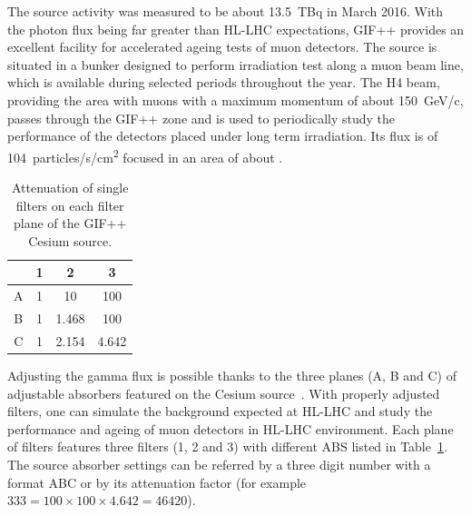 	The source activity was measured to be about \SI{13.5}{TBq} in March 2016. With the photon flux being far greater than HL-LHC expectations, GIF++ provides an excellent facility for accelerated ageing tests of muon detectors. The source is situated in a bunker designed to perform irradiation test along a muon beam line, which is available during selected periods throughout the year. The H4 beam, providing the area with muons with a maximum momentum of about \SI{150}{GeV/c}, passes through the GIF++ zone and is used to periodically study the performance of the detectors placed under long term irradiation. Its flux is of \SI{104}{particles/s/\square\cm} focused in an area of about .
	
\begingroup\setlength{\intextsep}{0pt}\setlength{\columnsep}{15pt}
	
	\begin{table}
		\centering
		\begin{tabular}{c|c|c|c|}
		\cline{2-4}
		                        & 1 & 2     & 3    \\
		\hline
		\multicolumn{1}{|c|}{A} & 1 & 10    & 100  \\
		\hline
		\multicolumn{1}{|c|}{B} & 1 & 1.468 & 100  \\
		\hline
		\multicolumn{1}{|c|}{C} & 1 & 2.154 & 4.642\\
		\hline
		\end{tabular}
		\caption{\label{tab:ABS-GIFpp} Attenuation of single filters on each filter plane of the GIF++ Cesium source.}
	\end{table}
	 
	Adjusting the gamma flux is possible thanks to the three planes (A, B and C) of adjustable absorbers featured on the Cesium source~\cite{GIFFILTERS}. With properly adjusted filters, one can simulate the background expected at HL-LHC and study the performance and ageing of muon detectors in HL-LHC environment. Each plane of filters features three filters (1, 2 and 3) with different \acf{ABS} listed in Table~\ref{tab:ABS-GIFpp}. The source absorber settings can be referred by a three digit number with a format ABC or by its attenuation factor (for example $333 = 100\times 100 \times 4.642 = 46420$).
	
\endgroup
	
